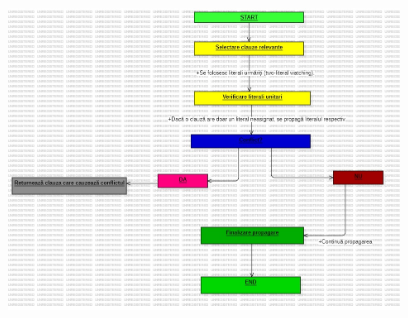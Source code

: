 \documentclass[runningheads]{llncs}
\begin{document}
 \begin{figure}[h] 
    \centering
    \includegraphics[height=8cm]{Propagate.jpg} 
    \label{fig:sample}
\end{figure}
\end{document}
